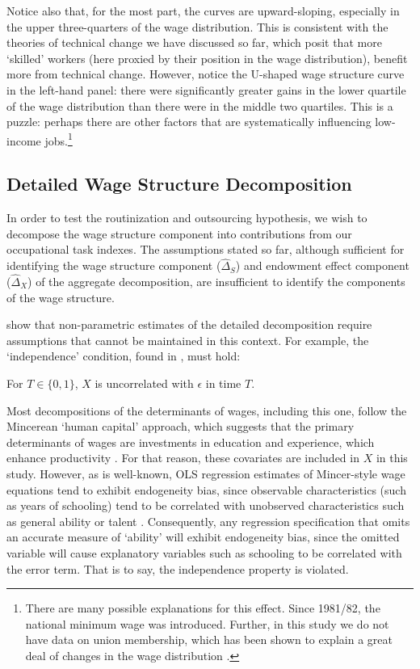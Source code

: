Notice also that, for the most part, the curves are upward-sloping, especially in the upper three-quarters of the wage distribution. This is consistent with the theories of technical change we have discussed so far, which posit that more `skilled' workers (here proxied by their position in the wage distribution), benefit more from technical change. However, notice the U-shaped wage structure curve in the left-hand panel: there were significantly greater gains in the lower quartile of the wage distribution than there were in the middle two quartiles. This is a puzzle: perhaps there are other factors that are systematically influencing low-income jobs.\footnote{There are many possible explanations for this effect. Since 1981/82, the national minimum wage was introduced. Further, in this study we do not have data on union membership, which has been shown to explain a great deal of changes in the wage distribution \citep{Leigh2013,Borland1996}.}

\subsection{Detailed Wage Structure Decomposition}

In order to test the routinization and outsourcing hypothesis, we wish to decompose the wage structure component into contributions from our occupational task indexes. The assumptions stated so far, although sufficient for identifying the wage structure component ($\hat{\Delta}_S$) and endowment effect component ($\hat{\Delta}_X$) of the aggregate decomposition, are insufficient to identify the components of the wage structure.

\citet[p.27]{Fortin2011} show that non-parametric estimates of the detailed decomposition require assumptions that cannot be maintained in this context. For example, the `independence' condition, found in \citet{Matzkin2003}, must hold:
\begin{assumption}[Independence]\label{ass:indep}
  For $T\in\{0,1\}$, $X$ is uncorrelated with $\epsilon$ in time $T$.
\end{assumption}
Most decompositions of the determinants of wages, including this one, follow the Mincerean `human capital' approach, which suggests that the primary determinants of wages are investments in education and experience, which enhance productivity \citep{Mincer1962}. For that reason, these covariates are included in $X$ in this study. However, as is well-known, OLS regression estimates of Mincer-style wage equations tend to exhibit endogeneity bias, since observable characteristics (such as years of schooling) tend to be correlated with unobserved characteristics such as general ability or talent \citep{Card1999}. Consequently, any regression specification that omits an accurate measure of `ability' will exhibit endogeneity bias, since the omitted variable will cause explanatory variables such as schooling to be correlated with the error term. That is to say, the independence property is violated.

